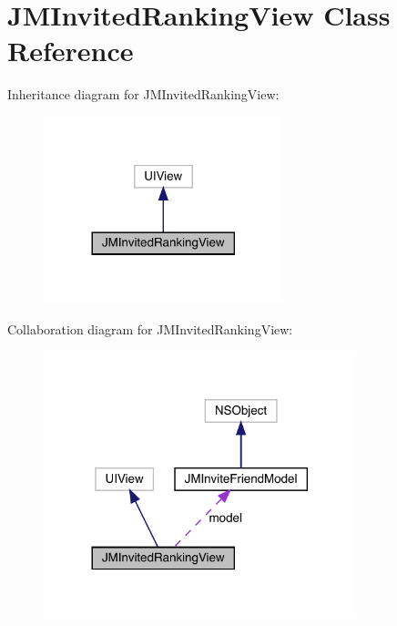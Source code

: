\hypertarget{interface_j_m_invited_ranking_view}{}\section{J\+M\+Invited\+Ranking\+View Class Reference}
\label{interface_j_m_invited_ranking_view}


Inheritance diagram for J\+M\+Invited\+Ranking\+View\+:\nopagebreak
\begin{figure}[H]
\begin{center}
\leavevmode
\includegraphics[width=197pt]{interface_j_m_invited_ranking_view__inherit__graph}
\end{center}
\end{figure}


Collaboration diagram for J\+M\+Invited\+Ranking\+View\+:\nopagebreak
\begin{figure}[H]
\begin{center}
\leavevmode
\includegraphics[width=257pt]{interface_j_m_invited_ranking_view__coll__graph}
\end{center}
\end{figure}
